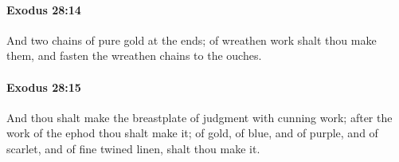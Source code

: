 		\paragraph{Exodus 28:14} %
			\label{EXODUS-28-14}

			And two chains of pure gold at the ends; of wreathen work shalt thou make them, and fasten the wreathen chains to the ouches.


		\paragraph{Exodus 28:15} %
			\label{EXODUS-28-15}

			And thou shalt make the breastplate of judgment with cunning work; after the work of the ephod thou shalt make it; of gold, of blue, and of purple, and of scarlet, and of fine twined linen, shalt thou make it.


